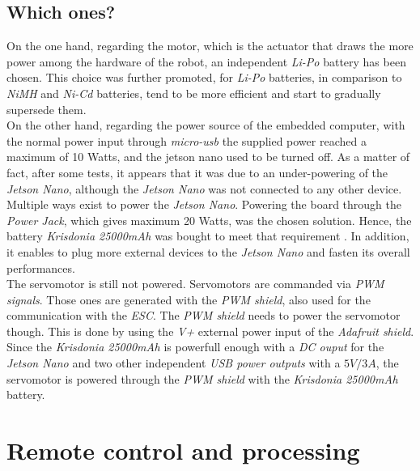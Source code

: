		\subsection{Which ones?}
		On the one hand, regarding the motor, which is the actuator that 
		draws the more power among the hardware of the robot, an independent 
		\textit{Li-Po} battery has been chosen. This choice
		was further promoted, for \textit{Li-Po} batteries, in 
		comparison to \textit{NiMH} and \textit{Ni-Cd} batteries, 
		tend to be more efficient and start to gradually 
		supersede them.
		\\\indent On the other hand, regarding the power source of the embedded computer, with 
		the normal power input through \textit{micro-usb} the supplied power
		reached a maximum of 10 Watts, and the jetson nano used to be turned off. As a matter of fact,
		after some tests, it appears that it was due to an under-powering of the 
		\textit{Jetson Nano}, although the \textit{Jetson Nano} was not connected
		to any other device. Multiple ways exist to power the \textit{Jetson Nano}.
		Powering the board through the \textit{Power Jack}, which gives maximum 20 Watts, 
		was the chosen solution. Hence, the battery \textit{Krisdonia 25000mAh} was bought to meet that 
		requirement \cite{nanopowerbank}. In addition, it enables to plug more external devices to the \textit{Jetson Nano}
		and fasten its overall performances.
		\\\indent The servomotor is still not powered. Servomotors are commanded
		via \textit{PWM signals}. Those ones are generated with the \textit{PWM shield}, also 
		used for the communication with the \textit{ESC}. The \textit{PWM shield} needs to power the 
		servomotor though. This is done by using the \textit{V+} external power input of
		the \textit{Adafruit shield}. Since the \textit{Krisdonia 25000mAh} is powerfull 
		enough with a \textit{DC ouput} for the \textit{Jetson Nano} and two other independent
		\textit{USB power outputs} with a $5V/3A$, the servomotor is powered through the \textit{PWM shield}
		with the \textit{Krisdonia 25000mAh} battery.
		\cite{jetsonhacksmorepower,nanoguide,elinuxdoc}
	
	\section{Remote control and processing}
		
